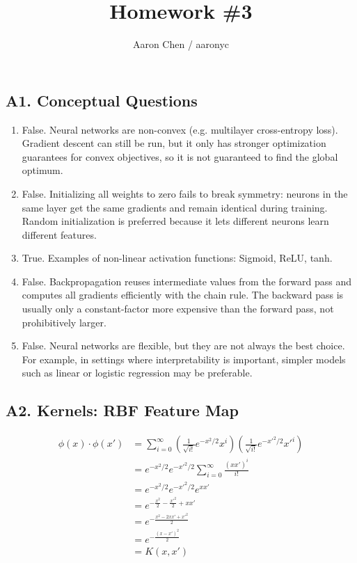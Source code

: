 \documentclass[fleqn]{article}
\begin{document}
\title{Homework \#3}
\author{Aaron Chen / aaronyc}
\date{}
\maketitle


\subsection*{A1. Conceptual Questions}

\begin{enumerate}[label=(\alph*)]
\item
False. Neural networks are non-convex (e.g. multilayer cross-entropy loss). Gradient descent can still be run, but it only has stronger optimization guarantees for convex objectives, so it is not guaranteed to find the global optimum.

\item
False. Initializing all weights to zero fails to break symmetry: neurons in the same layer get the same gradients and remain identical during training. Random initialization is preferred because it lets different neurons learn different features.

\item
True. Examples of non-linear activation functions: Sigmoid, ReLU, tanh.

\item
False. Backpropagation reuses intermediate values from the forward pass and computes all gradients efficiently with the chain rule. The backward pass is usually only a constant-factor more expensive than the forward pass, not prohibitively larger.

\item
False. Neural networks are flexible, but they are not always the best choice. For example, in settings where interpretability is important, simpler models such as linear or logistic regression may be preferable.
\end{enumerate}


\subsection*{A2. Kernels: RBF Feature Map}

\begin{align*}
\phi(x) \cdot \phi(x')
&= \sum_{i=0}^{\infty}
\left(\frac{1}{\sqrt{i!}}e^{-x^2/2}x^i\right)
\left(\frac{1}{\sqrt{i!}}e^{-{x'}^2/2}{x'}^i\right) \\
&= e^{-x^2/2}e^{-{x'}^2/2}
\sum_{i=0}^{\infty}\frac{(xx')^i}{i!} \\
&= e^{-x^2/2}e^{-{x'}^2/2}e^{xx'} \\
&= e^{-\frac{x^2}{2}-\frac{{x'}^2}{2}+xx'} \\
&= e^{-\frac{x^2-2xx'+{x'}^2}{2}} \\
&= e^{-\frac{(x-x')^2}{2}} \\
&= K(x,x')
\end{align*}
\end{document}
